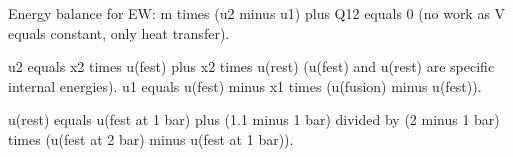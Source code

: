 Energy balance for EW:  
m times (u2 minus u1) plus Q12 equals 0 (no work as V equals constant, only heat transfer).  

u2 equals x2 times u(fest) plus x2 times u(rest) (u(fest) and u(rest) are specific internal energies).  
u1 equals u(fest) minus x1 times (u(fusion) minus u(fest)).  

u(rest) equals u(fest at 1 bar) plus (1.1 minus 1 bar) divided by (2 minus 1 bar) times (u(fest at 2 bar) minus u(fest at 1 bar)).